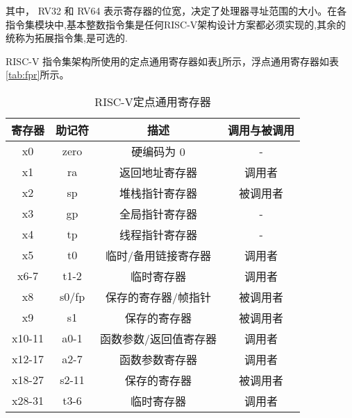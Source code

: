 其中， RV32 和 RV64 表示寄存器的位宽，决定了处理器寻址范围的大小。在各指令集模块中,基本整数指令集是任何RISC-V架构设计方案都必须实现的,其余的统称为拓展指令集,是可选的.


RISC-V 指令集架构所使用的定点通用寄存器如表\ref{tab:xpr}所示，浮点通用寄存器如表\ref{tab:fpr}所示。
\begin{table}[h]
  \centering
  \caption{RISC-V定点通用寄存器}
  \label{tab:xpr}
  \begin{tabular}{cccc}
    \toprule
寄存器 &	助记符	& 描述 &	调用与被调用\\
    \midrule
    x0 & zero & 硬编码为 0 & -\\
    x1 & ra & 返回地址寄存器 & 调用者\\
    x2 & sp & 堆栈指针寄存器 & 被调用者\\
    x3 & gp & 全局指针寄存器 & -\\
    x4 & tp & 线程指针寄存器 & -\\
    x5 & t0 & 临时/备用链接寄存器 & 调用者\\
    x6-7 & t1-2 & 临时寄存器 & 调用者\\
    x8 & s0/fp & 保存的寄存器/帧指针 & 被调用者\\
    x9 & s1 & 保存的寄存器 & 被调用者\\
    x10-11 & a0-1 & 函数参数/返回值寄存器 & 调用者\\
    x12-17 & a2-7 & 函数参数寄存器 & 调用者\\
    x18-27 & s2-11 & 保存的寄存器 & 被调用者\\
    x28-31	& t3-6 & 临时寄存器 & 调用者\\
    \bottomrule
  \end{tabular}
\end{table}


